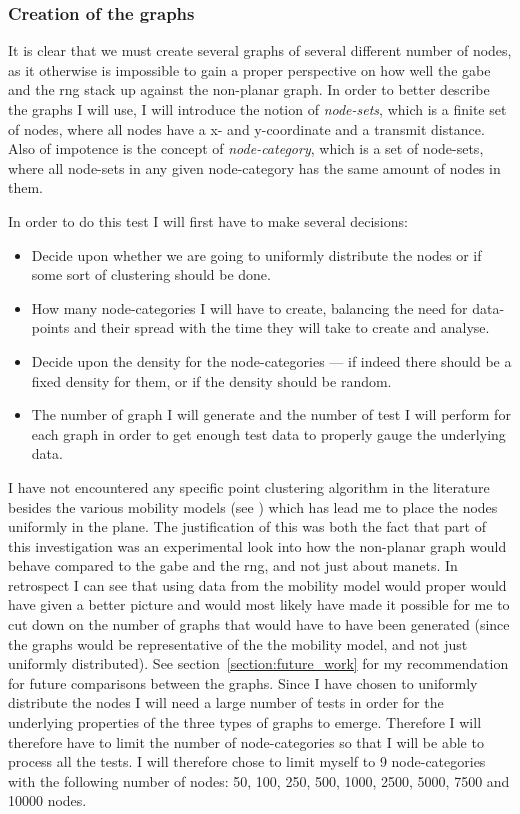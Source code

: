 \subsubsection{Creation of the graphs}
It is clear that we must create several graphs of several different number of nodes, as it otherwise is impossible to gain a proper perspective on how well the \ac{gabe} and the \ac{rng} stack up against the non-planar graph. In order to better describe the graphs I will use, I will introduce the notion of \emph{node-sets}, which is a finite set of nodes, where all nodes have a x- and y-coordinate and a transmit distance. Also of impotence is the concept of \emph{node-category}, which is a set of node-sets, where all node-sets in any given node-category has the same amount of nodes in them. 

In order to do this test I will first have to make several decisions:
\begin{itemize}
\item Decide upon whether we are going to uniformly distribute the nodes or if some sort of clustering should be done. 
\item How many node-categories I will have to create, balancing the need for data-points and their spread with the time they will take to create and analyse.
\item Decide upon the density for the node-categories --- if indeed there should be a fixed density for them, or if the density should be random.
\item The number of graph I will generate and the number of test I will perform for each graph in order to get enough test data to properly gauge the underlying data.
\end{itemize}

I have not encountered any specific point clustering algorithm in the literature besides the various mobility models (see \cite{disasterArea, MobilityAdHocResearch}) which has lead me to place the nodes uniformly in the plane. The justification of this was both the fact that part of this investigation was an experimental look into how the non-planar graph would behave compared to the \ac{gabe} and the \ac{rng}, and not just about \acp{manet}. In retrospect I can see that using data from the mobility model would proper would have given a better picture and would most likely have made it possible for me to cut down on the number of graphs that would have to have been generated (since the graphs would be representative of the the mobility model, and not just uniformly distributed). See section~\ref{section:future_work} for my recommendation for future comparisons between the graphs.   
Since I have chosen to uniformly distribute the nodes I will need a large number of tests in order for the underlying properties of the three types of graphs to emerge. Therefore I will therefore have to limit the number of node-categories so that I will be able to process all the tests. I will therefore chose to limit myself to 9 node-categories with the following number of nodes: 50, 100, 250, 500, 1000, 2500, 5000, 7500 and 10000 nodes.

